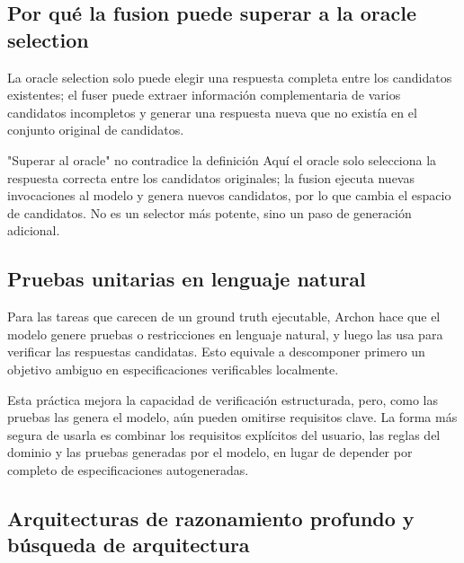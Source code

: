 \subsection{Por qué la fusion puede superar a la oracle selection}

La oracle selection solo puede elegir una respuesta completa entre los candidatos existentes; el fuser puede extraer información complementaria de varios candidatos incompletos y generar una respuesta nueva que no existía en el conjunto original de candidatos.


\begin{warningbox}{"Superar al oracle" no contradice la definición}
Aquí el oracle solo selecciona la respuesta correcta entre los candidatos originales; la fusion ejecuta nuevas invocaciones al modelo y genera nuevos candidatos, por lo que cambia el espacio de candidatos. No es un selector más potente, sino un paso de generación adicional.
\end{warningbox}

\subsection{Pruebas unitarias en lenguaje natural}

Para las tareas que carecen de un ground truth ejecutable, Archon hace que el modelo genere pruebas o restricciones en lenguaje natural, y luego las usa para verificar las respuestas candidatas. Esto equivale a descomponer primero un objetivo ambiguo en especificaciones verificables localmente.


Esta práctica mejora la capacidad de verificación estructurada, pero, como las pruebas las genera el modelo, aún pueden omitirse requisitos clave. La forma más segura de usarla es combinar los requisitos explícitos del usuario, las reglas del dominio y las pruebas generadas por el modelo, en lugar de depender por completo de especificaciones autogeneradas.

\subsection{Arquitecturas de razonamiento profundo y búsqueda de arquitectura}


